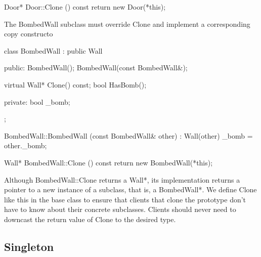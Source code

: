 \documentclass{report}
\begin{document}
\begin{itemize}
\begin{cppcode}
                Door* Door::Clone () const {
                    return new Door(*this);
                }
            \end{cppcode}
            \bigbreak \noindent 
            The BombedWall subclass must override Clone and implement a corresponding copy constructo
            \bigbreak \noindent 
            \begin{cppcode}
                class BombedWall : public Wall {
                public:
                    BombedWall();
                    BombedWall(const BombedWall&);

                    virtual Wall* Clone() const;
                    bool HasBomb();

                private:
                    bool _bomb;
                };

                BombedWall::BombedWall (const BombedWall& other) : Wall(other) {
                    _bomb = other._bomb;
                }

                Wall* BombedWall::Clone () const {
                    return new BombedWall(*this);
                }
            \end{cppcode}
            \bigbreak \noindent 
            Although BombedWall::Clone returns a Wall*, its implementation returns a pointer to a new instance of a subclass, that is, a BombedWall*. We define Clone like this in the base class to ensure that clients that clone the prototype don't have to know about their concrete subclasses. Clients should never need to downcast the return value of Clone to the desired type.


    \end{itemize}

    \pagebreak 
    \subsection{Singleton}
    \begin{itemize}
    \end{itemize}




    
\end{document}
